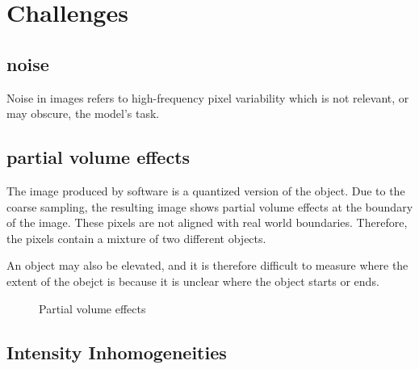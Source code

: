 \documentclass[11pt]{article}
\begin{document}
\section{Challenges}

\subsection{noise}

Noise in images refers to high-frequency pixel variability which is not relevant, or may obscure, the model's task.

\subsection{partial volume effects}

The image produced by software is a quantized version of the object. Due to the coarse sampling, the resulting image shows partial volume effects at the boundary of the image. These pixels are not aligned with real world boundaries. Therefore, the pixels contain a mixture of two different objects.

An object may also be elevated, and it is therefore difficult to measure where the extent of the obejct is because it is unclear where the object starts or ends.

\begin{figure}[H]
    \centering
    \caption{Partial volume effects}
\end{figure}

\subsection{Intensity Inhomogeneities}
\end{document}
